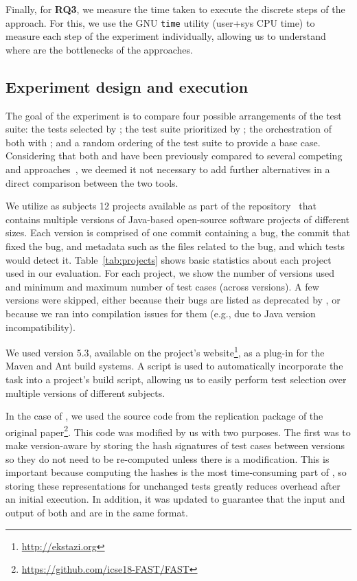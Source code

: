 Finally, for \textbf{RQ3}, we measure the time taken to execute the discrete steps of the approach.
For this, we use the GNU \texttt{time} utility (user+sys CPU time) to measure each step of the experiment individually, allowing us to understand where are the bottlenecks of the approaches.

\subsection{Experiment design and execution}
\label{subsec:experiment}

%

The goal of the experiment is to compare four possible arrangements of the test suite: 
the tests selected by \ek; the test suite prioritized by \fs; the orchestration of both with \fz; and a random ordering of the test suite to provide a base case.
Considering that both \ek and \fs have been previously compared to several competing \tcs and \tcp approaches~\cite{legunsen2016, Zhang18HybridRTS,miranda_fast}, we deemed it not necessary to add further alternatives in a direct comparison between the two tools.

We utilize as subjects 12 projects available as part of the \dfj repository~\cite{just2014defects4j} that contains multiple versions of Java-based open-source software projects of different sizes.
Each version is comprised of one commit containing a bug, the commit that fixed the bug, and metadata such as the files related to the bug, and which tests would detect it.
Table~\ref{tab:projects} shows basic statistics about each project
used in our evaluation.
For each project, we show the number of versions used and minimum and maximum number of test cases (across versions).
A few versions were skipped, either because their bugs are listed as deprecated by \dfj, or because we ran into compilation issues for them (e.g., due to Java version incompatibility).

We used \ek version 5.3, available on the project's website\footnote{\url{http://ekstazi.org}}, as a plug-in for the Maven and Ant build systems.
A script is used to automatically incorporate the \ek task into a project's build script, allowing us to easily perform test selection over multiple versions of different subjects.

In the case of \fs, we used the source code from the replication package of the original paper\footnote{\url{https://github.com/icse18-FAST/FAST}}.
This code was modified by us with two purposes.
The first was to make \fs version-aware by storing the hash signatures of test cases between versions so they do not need to be re-computed unless there is a modification.
This is important because computing the hashes is the most time-consuming part of \fs, so storing these representations for unchanged tests greatly reduces overhead after an initial execution.
In addition, it was updated to guarantee that the input and output of both \ek and \fs are in the same format.

